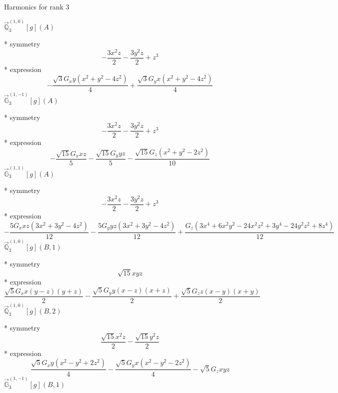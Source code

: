 \documentclass[fleqn,8pt]{jsarticle}
\begin{document}
\noindent * Harmonics for rank 3

\noindent\quad $\vec{\mathbb{Q}}_{3}^{(1,0)}[g](A)$

\noindent\quad ** symmetry
\begin{dmath*}
- \frac{3 x^{2} z}{2} - \frac{3 y^{2} z}{2} + z^{3}
\end{dmath*}
\noindent\quad ** expression
\begin{dmath*}
- \frac{\sqrt{3} G_{x} y \left(x^{2} + y^{2} - 4 z^{2}\right)}{4} + \frac{\sqrt{3} G_{y} x \left(x^{2} + y^{2} - 4 z^{2}\right)}{4}
\end{dmath*}
\noindent\quad $\vec{\mathbb{G}}_{3}^{(1,-1)}[g](A)$

\noindent\quad ** symmetry
\begin{dmath*}
- \frac{3 x^{2} z}{2} - \frac{3 y^{2} z}{2} + z^{3}
\end{dmath*}
\noindent\quad ** expression
\begin{dmath*}
- \frac{\sqrt{15} G_{x} x z}{5} - \frac{\sqrt{15} G_{y} y z}{5} - \frac{\sqrt{15} G_{z} \left(x^{2} + y^{2} - 2 z^{2}\right)}{10}
\end{dmath*}
\noindent\quad $\vec{\mathbb{G}}_{3}^{(1,1)}[g](A)$

\noindent\quad ** symmetry
\begin{dmath*}
- \frac{3 x^{2} z}{2} - \frac{3 y^{2} z}{2} + z^{3}
\end{dmath*}
\noindent\quad ** expression
\begin{dmath*}
- \frac{5 G_{x} x z \left(3 x^{2} + 3 y^{2} - 4 z^{2}\right)}{12} - \frac{5 G_{y} y z \left(3 x^{2} + 3 y^{2} - 4 z^{2}\right)}{12} + \frac{G_{z} \left(3 x^{4} + 6 x^{2} y^{2} - 24 x^{2} z^{2} + 3 y^{4} - 24 y^{2} z^{2} + 8 z^{4}\right)}{12}
\end{dmath*}
\noindent\quad $\vec{\mathbb{Q}}_{3}^{(1,0)}[g](B,1)$

\noindent\quad ** symmetry
\begin{dmath*}
\sqrt{15} x y z
\end{dmath*}
\noindent\quad ** expression
\begin{dmath*}
\frac{\sqrt{5} G_{x} x \left(y - z\right) \left(y + z\right)}{2} - \frac{\sqrt{5} G_{y} y \left(x - z\right) \left(x + z\right)}{2} + \frac{\sqrt{5} G_{z} z \left(x - y\right) \left(x + y\right)}{2}
\end{dmath*}
\noindent\quad $\vec{\mathbb{Q}}_{3}^{(1,0)}[g](B,2)$

\noindent\quad ** symmetry
\begin{dmath*}
\frac{\sqrt{15} x^{2} z}{2} - \frac{\sqrt{15} y^{2} z}{2}
\end{dmath*}
\noindent\quad ** expression
\begin{dmath*}
\frac{\sqrt{5} G_{x} y \left(x^{2} - y^{2} + 2 z^{2}\right)}{4} - \frac{\sqrt{5} G_{y} x \left(x^{2} - y^{2} - 2 z^{2}\right)}{4} - \sqrt{5} G_{z} x y z
\end{dmath*}
\noindent\quad $\vec{\mathbb{G}}_{3}^{(1,-1)}[g](B,1)$
\end{document}
